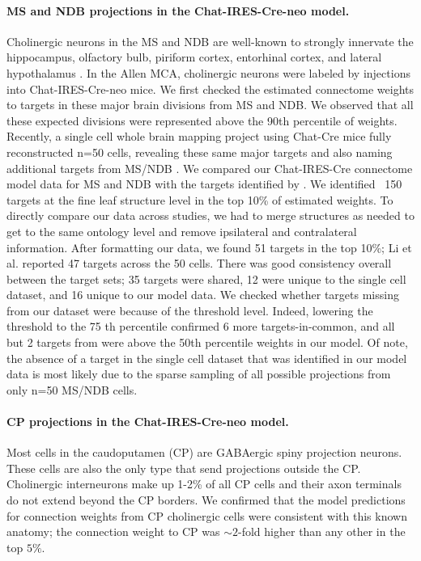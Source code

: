\paragraph{MS and NDB projections in the Chat-IRES-Cre-neo model.}
Cholinergic neurons in the MS and NDB are well-known to strongly innervate the hippocampus, olfactory bulb, piriform cortex, entorhinal cortex, and lateral hypothalamus \citep{Zaborszky2015-fm, Watson2012TheMN}.
In the Allen MCA, cholinergic neurons were labeled by injections into Chat-IRES-Cre-neo mice.
We first checked the estimated connectome weights to targets in these major brain divisions from MS and NDB.
We observed that all these expected divisions were represented above the 90th percentile of weights.
Recently, a single cell whole brain mapping project using Chat-Cre mice fully reconstructed n=50 cells, revealing these same major targets and also naming additional targets from MS/NDB \citep{Li2018-nu}. We compared our Chat-IRES-Cre connectome model data for MS and NDB with the targets identified by  \citet{Li2018-nu}.
We identified ~150 targets at the fine leaf structure level in the top 10\% of estimated weights. To directly compare our data across studies, we had to merge structures as needed to get to the same ontology level and remove ipsilateral and contralateral information.
After formatting our data, we found 51 targets in the top 10\%; Li et al. reported 47 targets across the 50 cells.
There was good consistency overall between the target sets; 35 targets were shared, 12 were unique to the single cell dataset, and 16 unique to our model data.
We checked whether targets missing from our dataset were because of the threshold level.
Indeed, lowering the threshold to the 75 th percentile confirmed 6 more targets-in-common, and all but 2 targets from \citet{ Li2018-nu} were above the 50th percentile weights in our model.
Of note, the absence of a target in the single cell dataset that was identified in our model data is most likely due to the sparse sampling of all possible projections from only n=50 MS/NDB cells.

\paragraph{CP projections in the Chat-IRES-Cre-neo model.}
Most cells in the caudoputamen (CP) are GABAergic spiny projection neurons.
These cells are also the only type that send projections outside the CP.
Cholinergic interneurons make up 1-2\% of all CP cells and their axon terminals do not extend beyond the CP borders.
We confirmed that the model predictions for connection weights from CP cholinergic cells were consistent with this known anatomy; the connection weight to CP was $\sim2$-fold higher than any other in the top $5\%$.

